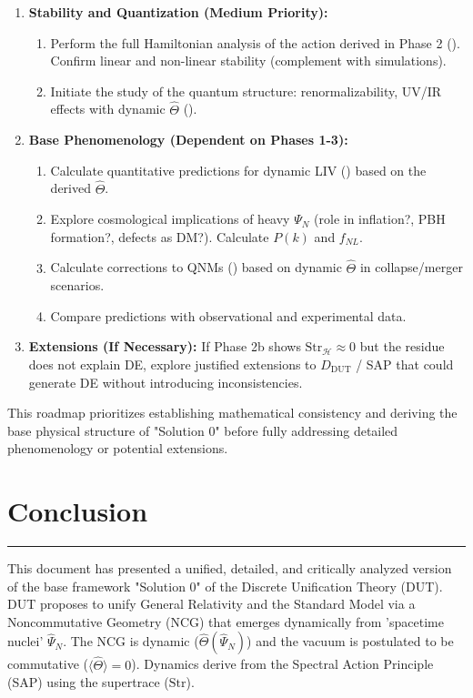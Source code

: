 \documentclass[11pt, a4paper]{article}
\theoremstyle{remark}
\newcommand{\Op}[1]{\hat{#1}}
\newcommand{\Str}{\mathrm{Str}}
\begin{document}
\begin{enumerate}[label=\textbf{Phase \arabic*}:, wide, labelwidth=!, labelindent=0pt, itemsep=2pt, topsep=3pt]
\begin{enumerate}[label=\alph*), itemsep=1pt]
        \end{enumerate}
    \item \textbf{Stability and Quantization (Medium Priority):}
        \begin{enumerate}[label=\alph*), itemsep=1pt]
            \item Perform the full Hamiltonian analysis of the action derived in Phase 2 (). Confirm linear and non-linear stability (complement with simulations).
            \item Initiate the study of the quantum structure: renormalizability, UV/IR effects with dynamic \( \Op{\Theta} \) ().
        \end{enumerate}
    \item \textbf{Base Phenomenology (Dependent on Phases 1-3):}
        \begin{enumerate}[label=\alph*), itemsep=1pt]
            \item Calculate quantitative predictions for dynamic LIV () based on the derived \( \Op{\Theta} \).
            \item Explore cosmological implications of heavy \( \Psi_N \) (role in inflation?, PBH formation?, defects as DM?). Calculate \( P(k) \) and \( f_{NL} \).
            \item Calculate corrections to QNMs () based on dynamic \( \Op{\Theta} \) in collapse/merger scenarios.
            \item Compare predictions with observational and experimental data.
        \end{enumerate}
    \item \textbf{Extensions (If Necessary):} If Phase 2b shows \( \Str_{\mathcal{H}} \approx 0 \) but the residue does not explain DE, explore justified extensions to \( D_{\text{DUT}} \) / SAP that could generate DE without introducing inconsistencies.
\end{enumerate}
This roadmap prioritizes establishing mathematical consistency and deriving the base physical structure of "Solution 0" before fully addressing detailed phenomenology or potential extensions.

\section{Conclusion}
\label{sec:conclusion_final_shifted}

\hrule
This document has presented a unified, detailed, and critically analyzed version of the base framework "Solution 0" of the Discrete Unification Theory (DUT). DUT proposes to unify General Relativity and the Standard Model via a Noncommutative Geometry (NCG) that emerges dynamically from 'spacetime nuclei' \( \Op{\Psi}_N \). The NCG is dynamic (\( \Op{\Theta}(\Op{\Psi}_N) \)) and the vacuum is postulated to be commutative (\( \langle \Op{\Theta} \rangle = 0 \)). Dynamics derive from the Spectral Action Principle (SAP) using the supertrace (\( \Str \)).
\end{document}
